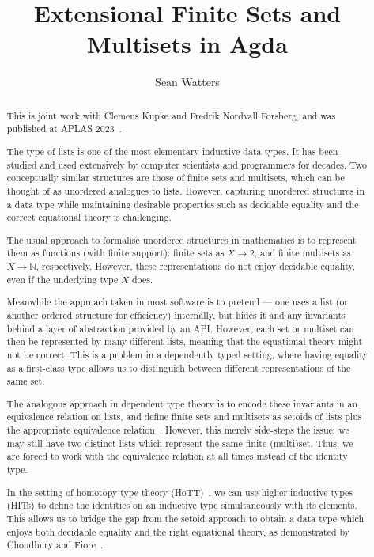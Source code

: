 \documentclass[a4paper]{easychair}
\title{Extensional Finite Sets and Multisets in Agda}
\author{
Sean Watters%
}
\institute{
  University of Strathclyde, UK\\
  \email{sean.watters@strath.ac.uk}
 }
\begin{document}
\maketitle

\begin{abstract}

  This is joint work with Clemens Kupke and Fredrik Nordvall Forsberg,
  and was published at APLAS 2023~\cite{freshlists}.

The type of lists is one of the most elementary inductive data types.
It has been studied and used extensively by computer scientists and programmers for decades.
Two conceptually similar structures are those of finite sets and multisets, which can be thought of as unordered analogues to lists.
However, capturing unordered structures in a data type while maintaining desirable properties such as decidable equality and the correct equational theory is challenging.

The usual approach to formalise unordered structures in mathematics
is to represent them as functions (with finite support): finite sets as $X \to 2$, and finite multisets as $X \to \mathbb{N}$, respectively.
However, these representations do not enjoy decidable equality, even if the underlying type $X$ does.

Meanwhile the approach taken in most software is to pretend --- one uses a list (or another ordered structure for efficiency) internally, but hides it and any invariants behind a layer of abstraction provided by an API.
However, each set or multiset can then be represented by many different lists,
meaning that the equational theory might not be correct. This is a problem
in a dependently typed setting, where
having equality as a first-class type allows us to
distinguish between different representations of the same set.

The analogous approach in dependent type theory is to encode these invariants in an equivalence relation on lists,
and define finite sets and multisets as setoids of lists plus the appropriate equivalence relation~\cite{gilles2003setoids}.
However, this merely side-steps the issue;
we may still have two distinct lists which represent the same finite (multi)set.
Thus, we are forced to work with the equivalence relation at all times instead of the identity type.

In the setting of homotopy type theory (HoTT)~\cite{hottbook}, we can use higher inductive types (HITs) to define the identities on an inductive type simultaneously with its elements.
This allows us to bridge the gap from the setoid approach to obtain a data type which enjoys both decidable equality and the right equational theory, as demonstrated by Choudhury and Fiore~\cite{choudhuryfiore2023freecommmon}.


\end{abstract}
\end{document}
